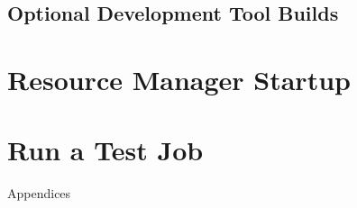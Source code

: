 \documentclass[letterpaper]{article}
\begin{document}
\subsection{Optional Development Tool Builds} \label{sec:3rdparty_intel}


\section{Resource Manager Startup} \label{sec:rms_startup}


\section{Run a Test Job} \label{sec:test_job}


\clearpage
\appendix
{\bf \LARGE \centerline{Appendices}} \vspace*{0.2cm}

\renewcommand{\thesubsection}{\Alph{subsection}}







\end{document}
